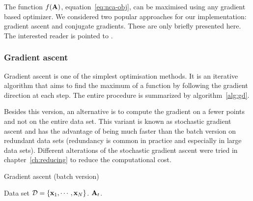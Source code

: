 	The function $f(\mathbf{A})$, equation~\eqref{eq:nca-obj}, can be maximised using any gradient based optimizer. We considered two popular approaches for our implementation: gradient ascent and conjugate gradients. These are only briefly presented here. The interested reader is pointed to \citep{bishop1995}.

	\subsubsection*{Gradient ascent}

	Gradient ascent is one of the simplest optimisation methods. It is an iterative algorithm that aims to find the maximum of a function by following the gradient direction at each step. The entire procedure is summarized by algorithm~\ref{alg:gd}. 

	Besides this version, an alternative is to compute the gradient on a fewer points and not on the entire data set. This variant is known as stochastic gradient ascent and has the advantage of being much faster than the batch version on redundant data sets (redundancy is common in practice and especially in large data sets). Different alterations of the stochastic gradient ascent were tried in chapter~\ref{ch:reducing} to reduce the computational cost.
      
	\begin{algorithm} 
		\caption{Gradient ascent (batch version)} 
		\label{alg:gd}  
		\begin{algorithmic}[1]                    %
			\REQUIRE Data set $\mathcal{D}=\{\mathbf{x}_1,\cdots,\mathbf{x}_N\}$.
			 \label{alg:gd-init}
			\REPEAT
			\RETURN $\mathbf{A}_{t}$.
		\end{algorithmic}
	\end{algorithm}

